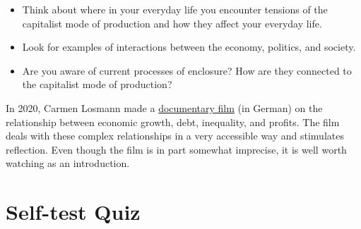 \documentclass[
  british,
  a4paper,
  DIV=11,
  numbers=noendperiod,
  oneside,
  openany]{scrreprt}
\providecommand{\tightlist}{%
  \setlength{\itemsep}{0pt}\setlength{\parskip}{0pt}}
\begin{document}
\begin{tcolorbox}[enhanced jigsaw, arc=.35mm, bottomrule=.15mm, bottomtitle=1mm, breakable, colback=white, colbacktitle=quarto-callout-caution-color!10!white, colframe=quarto-callout-caution-color-frame, coltitle=black, left=2mm, leftrule=.75mm, opacityback=0, opacitybacktitle=0.6, rightrule=.15mm, title={In-depth questions}, titlerule=0mm, toprule=.15mm, toptitle=1mm]

\begin{itemize}
\tightlist
\item
  Think about where in your everyday life you encounter tensions of the
  capitalist mode of production and how they affect your everyday life.
\item
  Look for examples of interactions between the economy, politics, and
  society.
\item
  Are you aware of current processes of enclosure? How are they
  connected to the capitalist mode of production?
\end{itemize}

\end{tcolorbox}

\begin{tcolorbox}[enhanced jigsaw, arc=.35mm, bottomrule=.15mm, bottomtitle=1mm, breakable, colback=white, colbacktitle=quarto-callout-note-color!10!white, colframe=quarto-callout-note-color-frame, coltitle=black, left=2mm, leftrule=.75mm, opacityback=0, opacitybacktitle=0.6, rightrule=.15mm, title={Further material -- Oeconomia: Economic growth, debt, inequality, and
profits}, titlerule=0mm, toprule=.15mm, toptitle=1mm]

In 2020, Carmen Losmann made a
\href{https://www.3sat.de/film/dokumentarfilm/oeconomia-100.html}{documentary
film} (in German) on the relationship between economic growth, debt,
inequality, and profits. The film deals with these complex relationships
in a very accessible way and stimulates reflection. Even though the film
is in part somewhat imprecise, it is well worth watching as an
introduction.

\end{tcolorbox}

\section*{Self-test Quiz}\label{self-test-quiz-1}

\end{document}
